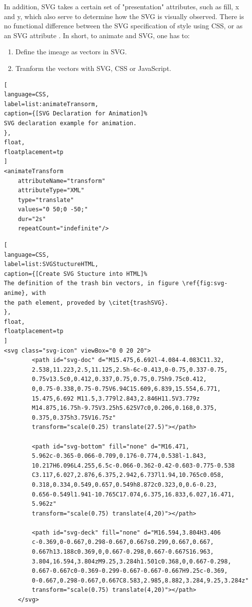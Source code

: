 In addition, SVG takes a certain set of "presentation" attributes, such as 
fill, x and y, which also serve to determine how the SVG is visually observed. 
There is no functional difference between the SVG specification of style using 
CSS, or as an SVG attribute \citep{w3schoolSVG}. In short, to animate and SVG, 
one has to:
\begin{enumerate}
\item Define the imeage as vectors in SVG.
\item Tranform the vectors with SVG, CSS or JavaScript.
\end{enumerate}
\begin{lstlisting}[
language=CSS,
label=list:animateTransorm,
caption={[SVG Declaration for Animation]%
SVG declaration example for animation.
},
float,
floatplacement=tp
]
<animateTransform
	attributeName="transform"
	attributeType="XML"
	type="translate"
	values="0 50;0 -50;"
	dur="2s"
	repeatCount="indefinite"/>

\end{lstlisting}

\begin{lstlisting}[
language=CSS,
label=list:SVGStuctureHTML,
caption={[Create SVG Stucture into HTML]%
The definition of the trash bin vectors, in figure \ref{fig:svg-anime}, with 
the path element, proveded by \citet{trashSVG}.
},
float,
floatplacement=tp
]
<svg class="svg-icon" viewBox="0 0 20 20">
		<path id="svg-doc" d="M15.475,6.692l-4.084-4.083C11.32,
		2.538,11.223,2.5,11.125,2.5h-6c-0.413,0-0.75,0.337-0.75,
		0.75v13.5c0,0.412,0.337,0.75,0.75,0.75h9.75c0.412,
		0,0.75-0.338,0.75-0.75V6.94C15.609,6.839,15.554,6.771,
		15.475,6.692 M11.5,3.779l2.843,2.846H11.5V3.779z
		M14.875,16.75h-9.75V3.25h5.625V7c0,0.206,0.168,0.375,
		0.375,0.375h3.75V16.75z"
		transform="scale(0.25) translate(27.5)"></path>

		<path id="svg-bottom" fill="none" d="M16.471,
		5.962c-0.365-0.066-0.709,0.176-0.774,0.538l-1.843,
		10.217H6.096L4.255,6.5c-0.066-0.362-0.42-0.603-0.775-0.538
		C3.117,6.027,2.876,6.375,2.942,6.737l1.94,10.765c0.058,
		0.318,0.334,0.549,0.657,0.549h8.872c0.323,0,0.6-0.23,
		0.656-0.549l1.941-10.765C17.074,6.375,16.833,6.027,16.471,
		5.962z"
		transform="scale(0.75) translate(4,20)"></path>

		<path id="svg-deck" fill="none" d="M16.594,3.804H3.406
		c-0.369,0-0.667,0.298-0.667,0.667s0.299,0.667,0.667,
		0.667h13.188c0.369,0,0.667-0.298,0.667-0.667S16.963,
		3.804,16.594,3.804zM9.25,3.284h1.501c0.368,0,0.667-0.298,
		0.667-0.667c0-0.369-0.299-0.667-0.667-0.667H9.25c-0.369,
		0-0.667,0.298-0.667,0.667C8.583,2.985,8.882,3.284,9.25,3.284z"
		transform="scale(0.75) translate(4,20)"></path>
	</svg>

\end{lstlisting}

